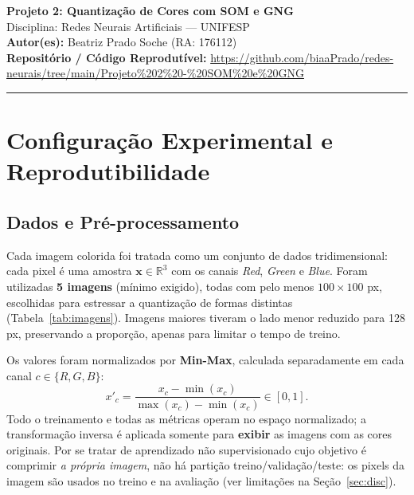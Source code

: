 \documentclass[11pt,a4paper]{article}
\begin{document}
\begin{center}
    {\LARGE \textbf{Projeto 2: Quantização de Cores com SOM e GNG}} \\[0.35em]
    {\large Disciplina: Redes Neurais Artificiais --- UNIFESP} \\[0.3em]
    \textbf{Autor(es):} Beatriz Prado Soche (RA: 176112) \\[0.2em]
    \textbf{Repositório / Código Reprodutível:} \url{https://github.com/biaaPrado/redes-neurais/tree/main/Projeto%202%20-%20SOM%20e%20GNG}
\end{center}
\vspace{-0.5em}
\hrule
\vspace{0.8em}

\section{Configuração Experimental e Reprodutibilidade}

\subsection{Dados e Pré-processamento}
Cada imagem colorida foi tratada como um conjunto de dados tridimensional: cada pixel é uma amostra $\mathbf{x}\in\mathbb{R}^3$ com os canais \textit{Red}, \textit{Green} e \textit{Blue}. Foram utilizadas \textbf{5 imagens} (mínimo exigido), todas com pelo menos $100\times100$ px, escolhidas para estressar a quantização de formas distintas (Tabela~\ref{tab:imagens}). Imagens maiores tiveram o lado menor reduzido para 128 px, preservando a proporção, apenas para limitar o tempo de treino.

Os valores foram normalizados por \textbf{Min-Max}, calculada separadamente em cada canal $c\in\{R,G,B\}$:
\begin{equation}
x'_c = \frac{x_c - \min(x_c)}{\max(x_c) - \min(x_c)} \in [0,1].
\end{equation}
Todo o treinamento e todas as métricas operam no espaço normalizado; a transformação inversa é aplicada somente para \textbf{exibir} as imagens com as cores originais. Por se tratar de aprendizado não supervisionado cujo objetivo é comprimir \textit{a própria imagem}, não há partição treino/validação/teste: os pixels da imagem são usados no treino e na avaliação (ver limitações na Seção~\ref{sec:disc}).
\end{document}
